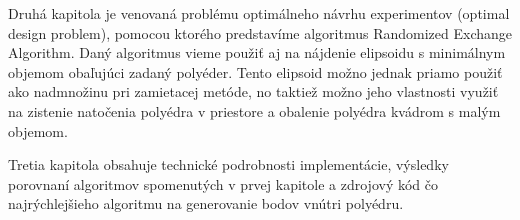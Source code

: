 Druhá kapitola je venovaná problému optimálneho návrhu experimentov (optimal design problem), pomocou ktorého predstavíme algoritmus Randomized Exchange Algorithm. Daný algoritmus vieme použiť aj na nájdenie elipsoidu s minimálnym objemom obaľujúci zadaný polyéder. Tento elipsoid možno jednak priamo použiť ako nadmnožinu pri zamietacej metóde, no taktiež možno jeho vlastnosti využiť na zistenie natočenia polyédra v priestore a obalenie polyédra kvádrom s malým objemom.

Tretia kapitola obsahuje technické podrobnosti implementácie, výsledky porovnaní algoritmov spomenutých v prvej kapitole a zdrojový kód čo najrýchlejšieho algoritmu na generovanie bodov vnútri polyédru.